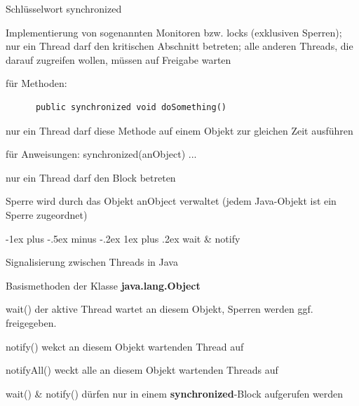 \documentclass[10pt]{article}
\makeatletter
\renewcommand{\subsubsection}{\@startsection{subsubsection}{3}{0mm}%
                                {-1ex plus -.5ex minus -.2ex}%
                                {1ex plus .2ex}%
                                {\normalfont\small\bfseries}}
\makeatother
\begin{document}
\begin{itemize*}
  \item Schlüsselwort synchronized
  \begin{itemize*}
    \item Implementierung von sogenannten Monitoren bzw. locks (exklusiven Sperren); nur ein Thread darf den kritischen Abschnitt betreten; alle anderen Threads, die darauf zugreifen wollen, müssen auf Freigabe warten
    \item für Methoden:
    \begin{lstlisting}
      public synchronized void doSomething()
  \end{lstlisting}
    \begin{itemize*}
      \item nur ein Thread darf diese Methode auf einem Objekt zur gleichen Zeit ausführen
    \end{itemize*}
    \item für Anweisungen: synchronized(anObject) { ... }
    \begin{itemize*}
      \item nur ein Thread darf den Block betreten
      \item Sperre wird durch das Objekt anObject verwaltet (jedem Java-Objekt ist ein Sperre zugeordnet)
    \end{itemize*}
  \end{itemize*}
\end{itemize*}

\subsubsection{wait \& notify}
\begin{description*}
  \item[] Signalisierung zwischen Threads in Java
  \item[] Basismethoden der Klasse \textbf{java.lang.Object}
  \item[wait()] der aktive Thread wartet an diesem Objekt, Sperren werden ggf. freigegeben.
  \item[notify()] wekct an diesem Objekt wartenden Thread auf
  \item[notifyAll()] weckt alle an diesem Objekt wartenden Threads auf
  \item[wait() \& notify()] dürfen nur in einem \textbf{synchronized}-Block aufgerufen werden
\end{description*}
\end{document}
